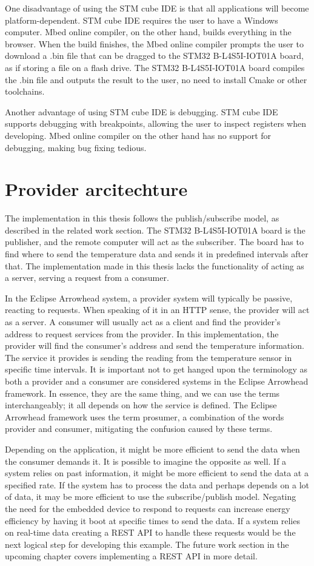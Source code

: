 One disadvantage of using the STM cube IDE is that all applications will become platform-dependent.
STM cube IDE requires the user to have a Windows computer. 
Mbed online compiler, on the other hand, builds everything in the browser.
When the build finishes, the Mbed online compiler prompts the user to download a .bin file that can be dragged to the STM32 B-L4S5I-IOT01A board, as if storing a file on a flash drive.
The STM32 B-L4S5I-IOT01A board compiles the .bin file and outputs the result to the user, no need to install Cmake or other toolchains. 

Another advantage of using STM cube IDE is debugging. 
STM cube IDE supports debugging with breakpoints, allowing the user to inspect registers when developing.
Mbed online compiler on the other hand has no support for debugging, making bug fixing tedious.

\section{Provider arcitechture}
The implementation in this thesis follows the publish/subscribe model, as described in the related work section. 
The STM32 B-L4S5I-IOT01A board is the publisher, and the remote computer will act as the subscriber.
The board has to find where to send the temperature data and sends it in predefined intervals after that. 
The implementation made in this thesis lacks the functionality of acting as a server, serving a request from a consumer.


In the Eclipse Arrowhead system, a provider system will typically be passive, reacting to requests.
When speaking of it in an HTTP sense, the provider will act as a server.
A consumer will usually act as a client and find the provider's address to request services from the provider. 
In this implementation, the provider will find the consumer's address and send the temperature information.
The service it provides is sending the reading from the temperature sensor in specific time intervals. 
It is important not to get hanged upon the terminology as both a provider and a consumer are considered systems in the Eclipse Arrowhead framework. 
In essence, they are the same thing, and we can use the terms interchangeably; it all depends on how the service is defined.
The Eclipse Arrowhead framework uses the term prosumer, a combination of the words provider and consumer, mitigating the confusion caused by these terms.

Depending on the application, it might be more efficient to send the data when the consumer demands it. 
It is possible to imagine the opposite as well.
If a system relies on past information, it might be more efficient to send the data at a specified rate.
If the system has to process the data and perhaps depends on a lot of data, it may be more efficient to use the subscribe/publish model. 
Negating the need for the embedded device to respond to requests can increase energy efficiency by having it boot at specific times to send the data.
If a system relies on real-time data creating a REST API to handle these requests would be the next logical step for developing this example.
The future work section in the upcoming chapter covers implementing a REST API in more detail. 


